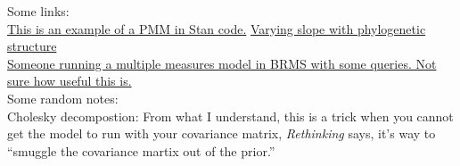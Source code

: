 \documentclass[11pt,letter]{article}
\begin{document}
\clearpage
Some links:\\
\href{https://groups.google.com/forum/#!topic/stan-users/Irv9RWDCpQE}{This is an example of a PMM in Stan code.}
\href{https://discourse.mc-stan.org/t/varying-slope-with-phylogenetic-structure/5739/4}{Varying slope with phylogenetic structure}\\
\href{https://discourse.mc-stan.org/t/multivariate-phylogenetic-with-repeated-measurements-model-help/14359/6}{Someone running a multiple measures model in BRMS with some queries. Not sure how useful this is.}\\

Some random notes:\\
Cholesky decompostion: From what I understand, this is a trick when you cannot get the model to run with your covariance matrix, \emph{Rethinking} says, it's way to ``smuggle the covariance martix out of the prior.''
\end{document}
